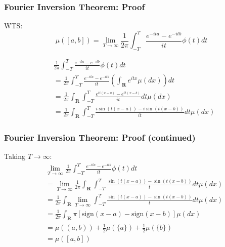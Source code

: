 \documentclass[handout]{beamer}
\begin{document}
\frame
{
  \frametitle{Fourier Inversion Theorem: Proof} 

WTS: $$\mu([a,b])=\lim_{T\rightarrow \infty} \frac{1}{2\pi} \int_{-T}^T \frac{e^{-ita}-e^{-itb}}{it} \phi(t) dt$$

\begin{align*}
&\frac{1}{2\pi} \int_{-T}^T \frac{e^{-ita}-e^{-itb}}{it} \phi(t) dt \\
&= \frac{1}{2\pi} \int_{-T}^T \frac{e^{-ita}-e^{-itb}}{it} \left( \int_{\mathbf{R}} e^{itx} \mu(dx)  \right) dt \tag{Fubini and first Lemma} \\
&= \frac{1}{2\pi} \int_{\mathbf{R}} \int_{-T}^T \frac{ e^{it(x-a)}-  e^{it(x-b)}  }{it} dt  \mu(dx) \\ 
&= \frac{1}{2\pi} \int_{\mathbf{R}} \int_{-T}^T \frac{ i\sin(t(x-a))- i \sin( t(x-b))  }{it} dt  \mu(dx)  
\end{align*}  
}

\frame
{
  \frametitle{Fourier Inversion Theorem: Proof (continued) } 
Taking $T \to \infty$:
\begin{align*}
& \lim_{T \to \infty} \frac{1}{2\pi} \int_{-T}^T \frac{e^{-ita}-e^{-itb}}{it} \phi(t) dt \\
&= \lim_{T \to \infty}\frac{1}{2\pi} \int_{\mathbf{R}} \int_{-T}^T \frac{ \sin(t(x-a))-  \sin( t(x-b))  }{t} dt  \mu(dx)  \\
&= \frac{1}{2\pi}   \int_{\mathbf{R}} \lim_{T \to \infty} \int_{-T}^T \frac{ \sin(t(x-a))-  \sin( t(x-b))  }{t} dt  \mu(dx)  \tag{DCT} \\
&= \frac{1}{2\pi}   \int_{\mathbf{R}} \pi\left[\text{sign}(x-a) - \text{sign}(x-b) \right]  \mu(dx)  \tag{Lemma 2} \\
&= \mu((a,b)) + \frac{1}{2} \mu(\{a\}) + \frac{1}{2}\mu(\{b\}) \\
&=\mu([a,b])
\end{align*}  


}
\end{document}

